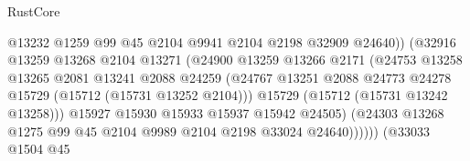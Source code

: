 \begin{lexlean}{RustCore}
\begin{coremodule}
                                        @13232
                                        @1259
                                        @99
                                        @45
                                        @2104
                                        @9941
                                        @2104
                                        @2198
                                        @32909
                                        @24640))
                                    (@32916
                                      @13259
                                      @13268
                                      @2104
                                      @13271
                                      (@24900
                                        @13259
                                        @13266
                                        @2171
                                        (@24753
                                          @13258
                                          @13265
                                          @2081
                                          @13241
                                          @2088
                                          @24259
                                          (@24767
                                            @13251
                                            @2088
                                            @24773
                                            @24278
                                            @15729
                                            (@15712 (@15731 @13252 @2104)))
                                          @15729
                                          (@15712 (@15731 @13242 @13258)))
                                        @15927
                                        @15930
                                        @15933
                                        @15937
                                        @15942
                                        @24505)
                                      (@24303
                                        @13268
                                        @1275
                                        @99
                                        @45
                                        @2104
                                        @9989
                                        @2104
                                        @2198
                                        @33024
                                        @24640))))))
                            (@33033
                              @1504
                              @45

\end{coremodule}
\end{lexlean}
